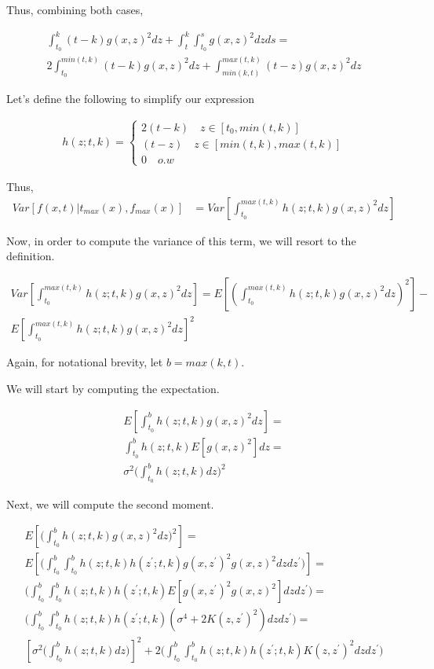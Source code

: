 Thus, combining both cases,

\begin{align}
\label{eq:final_integral}
    \int_{t_0}^k (t-k) g(x,z)^2dz + \int_t^k \int_{t_0}^s g(x,z)^2 dz ds \nonumber = \\
    2 \int_{t_0}^{min(t,k)} (t - k) g(x,z)^2dz + \int_{min(k,t)}^{max(t,k)} (t-z) g(x,z)^2dz
\end{align}

Let's define the following to simplify our expression

\begin{align}
h(z; t, k) = 
    \begin{cases}
        2(t-k) \quad z \in [t_0, min(t,k)] \\
        (t-z) \quad z \in [min(t,k), max(t,k)] \\
        0 \quad o.w
    \end{cases}
\end{align}

Thus,
\begin{align}
    Var[f(x,t) | t_{max}(x), f_{max}(x)] & = Var[\int_{t_0}^{max(t,k)} h(z; t, k) g(x,z)^2 dz]
\end{align}


Now, in order to compute the variance of this term, we will resort to the definition.

\begin{align}
    Var[\int_{t_0}^{max(t,k)} h(z; t, k) g(x,z)^2 dz] = E[(\int_{t_0}^{max(t,k)} h(z; t, k) g(x,z)^2 dz)^2] - \nonumber\\ E[\int_{t_0}^{max(t,k)} h(z; t, k) g(x,z)^2 dz]^2
\end{align}

Again, for notational brevity, let $ b = max(k,t)$. 

We will start by computing the expectation.

\begin{align}
    E[\int_{t_0}^{b} h(z; t,k) g(x,z)^2dz] = \nonumber \\
    \int_{t_0}^{b} h(z; t, k) E[g(x,z)^2]dz = \nonumber \\
    \sigma^2 \bigg(\int_{t_0}^{b} h(z; t, k)dz \bigg)^2
\end{align}

Next, we will compute the second moment.

\begin{align}
    E[\bigg(\int_{t_0}^{b} h(z; t,k) g(x,z)^2dz\bigg)^2] = \nonumber \\
    E[\bigg(\int_{t_0}^{b}\int_{t_0}^{b} h(z; t,k)h(z^{'}; t, k)g(x,z^{'})^2 g(x,z)^2dzdz^{'}\bigg)] = \nonumber \\
    \bigg(\int_{t_0}^{b}\int_{t_0}^{b} h(z; t, k)h(z^{'}; t, k) E[g(x,z^{'})^2 g(x,z)^2] dzdz^{'}\bigg) = \nonumber \\
    \bigg(\int_{t_0}^{b}\int_{t_0}^{b} h(z; t, k)h(z^{'}; t, k) (\sigma^4 + 2 K(z,z^{'})^2) dzdz^{'}\bigg) = \nonumber \\
    [\sigma^2 \bigg(\int_{t_0}^{b} h(z; t, k)dz \bigg)]^2 + 2\bigg(\int_{t_0}^{b}\int_{t_0}^{b} h(z; t, k)h(z^{'}; t, k) K(z,z^{'})^2dzdz^{'}\bigg)
\end{align}

